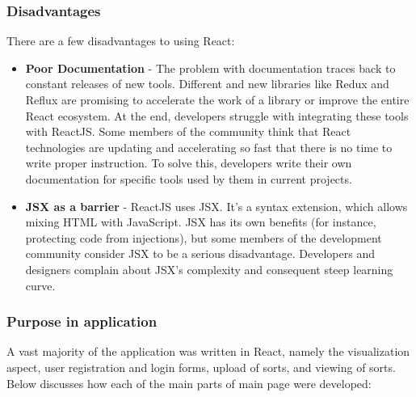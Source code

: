 \subsubsection{Disadvantages}
There are a few disadvantages to using React:

\begin{itemize}
    \item \textbf{Poor Documentation} - The problem with documentation traces back to constant releases of new tools. Different and new libraries like Redux and Reflux are promising to accelerate the work of a library or improve the entire React ecosystem. At the end, developers struggle with integrating these tools with ReactJS. Some members of the community think that React technologies are updating and accelerating so fast that there is no time to write proper instruction. To solve this, developers write their own documentation for specific tools used by them in current projects.
    \item \textbf{JSX as a barrier} - ReactJS uses JSX. It’s a syntax extension, which allows mixing HTML with JavaScript. JSX has its own benefits (for instance, protecting code from injections), but some members of the development community consider JSX to be a serious disadvantage. Developers and designers complain about JSX’s complexity and consequent steep learning curve.
\end{itemize}

\newpage
\subsubsection{Purpose in application}
A vast majority of the application was written in React, namely the visualization aspect, user registration and login forms, upload of sorts, and viewing of sorts. Below discusses how each of the main parts of main page were developed:
\par
\bigskip
